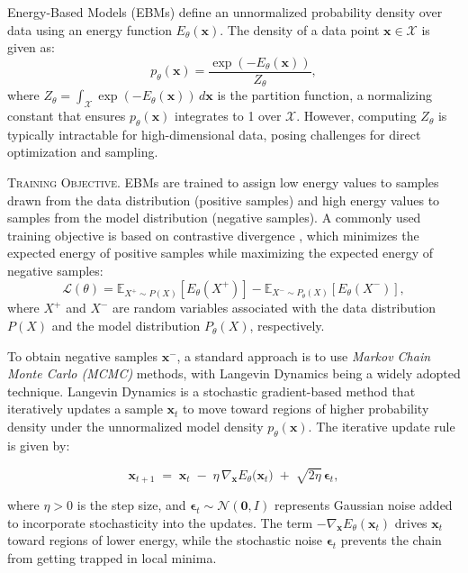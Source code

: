 Energy-Based Models (EBMs) \cite{lecun2006tutorial} define an unnormalized probability density over data using an energy function \( E_\theta(\mathbf{x}) \). The density of a data point \( \mathbf{x} \in \mathcal{X} \) is given as:
\[
p_\theta(\mathbf{x}) = \frac{\exp(-E_\theta(\mathbf{x}))}{Z_\theta},
\]
where \( Z_\theta = \int_{\mathcal{X}} \exp(-E_\theta(\mathbf{x})) \, d\mathbf{x} \) is the partition function, a normalizing constant that ensures \( p_\theta(\mathbf{x}) \) integrates to 1 over \( \mathcal{X} \). However, computing \( Z_\theta \) is typically intractable for high-dimensional data, posing challenges for direct optimization and sampling.

\textsc{Training Objective.} EBMs are trained to assign low energy values to samples drawn from the data distribution (positive samples) and high energy values to samples from the model distribution (negative samples). A commonly used training objective is based on contrastive divergence \cite{hinton2002training}, which minimizes the expected energy of positive samples while maximizing the expected energy of negative samples:
\[
\mathcal{L}(\theta) = \mathbb{E}_{X^+ \sim P(X)} [E_\theta(X^+)] - \mathbb{E}_{X^- \sim P_\theta(X)} [E_\theta(X^-)],
\]
where \( X^+ \) and \( X^- \) are random variables associated with the data distribution \( P(X) \) and the model distribution \( P_\theta(X) \), respectively. 

To obtain negative samples \(\mathbf{x}^-\), a standard approach is to use \textit{Markov Chain Monte Carlo (MCMC)} methods, with Langevin Dynamics \cite{langevin1908theorie, neal2011mcmc} being a widely adopted technique. Langevin Dynamics is a stochastic gradient-based method that iteratively updates a sample \(\mathbf{x}_t\) to move toward regions of higher probability density under the unnormalized model density \(p_\theta(\mathbf{x})\). The iterative update rule is given by:

\[
\mathbf{x}_{t+1} \;=\; \mathbf{x}_t \;-\; \eta\,\nabla_{\mathbf{x}} E_\theta\bigl(\mathbf{x}_t\bigr) \;+\; \sqrt{2\eta}\,\boldsymbol{\epsilon}_t,
\]

\noindent where \(\eta>0\) is the step size, and \(\boldsymbol{\epsilon}_t \sim \mathcal{N}(\mathbf{0}, I)\) represents Gaussian noise added to incorporate stochasticity into the updates. The term \(-\nabla_{\mathbf{x}} E_\theta(\mathbf{x}_t)\) drives \(\mathbf{x}_t\) toward regions of lower energy, while the stochastic noise \(\boldsymbol{\epsilon}_t\) prevents the chain from getting trapped in local minima.

